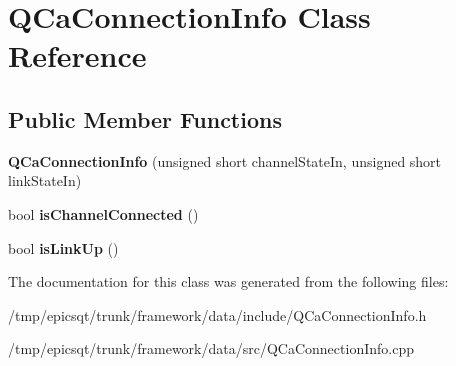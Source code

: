 \hypertarget{classQCaConnectionInfo}{
\section{QCaConnectionInfo Class Reference}
\label{classQCaConnectionInfo}
}
\subsection*{Public Member Functions}
\begin{DoxyCompactItemize}
\item 
\hypertarget{classQCaConnectionInfo_aa5fd9d318291a8fbda052b2c53eba0b0}{
{\bfseries QCaConnectionInfo} (unsigned short channelStateIn, unsigned short linkStateIn)}
\label{classQCaConnectionInfo_aa5fd9d318291a8fbda052b2c53eba0b0}

\item 
\hypertarget{classQCaConnectionInfo_af13b1c51e3e0e60036557cb168001cbf}{
bool {\bfseries isChannelConnected} ()}
\label{classQCaConnectionInfo_af13b1c51e3e0e60036557cb168001cbf}

\item 
\hypertarget{classQCaConnectionInfo_a7ea609f5fe71fd9f5f86a8596da32ae6}{
bool {\bfseries isLinkUp} ()}
\label{classQCaConnectionInfo_a7ea609f5fe71fd9f5f86a8596da32ae6}

\end{DoxyCompactItemize}


The documentation for this class was generated from the following files:\begin{DoxyCompactItemize}
\item 
/tmp/epicsqt/trunk/framework/data/include/QCaConnectionInfo.h\item 
/tmp/epicsqt/trunk/framework/data/src/QCaConnectionInfo.cpp\end{DoxyCompactItemize}
